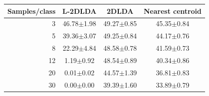 \begin{tabular}{rccc}
\toprule
Samples/class & L-2DLDA & 2DLDA & Nearest centroid \\
\midrule
3 & 46.78$\pm$1.98 & 49.27$\pm$0.85 & 45.35$\pm$0.84 \\
5 & 39.36$\pm$3.07 & 49.25$\pm$0.84 & 44.17$\pm$0.76 \\
8 & 22.29$\pm$4.84 & 48.58$\pm$0.78 & 41.59$\pm$0.73 \\
12 & 1.19$\pm$0.92 & 48.54$\pm$0.89 & 40.34$\pm$0.86 \\
20 & 0.01$\pm$0.02 & 44.57$\pm$1.39 & 36.81$\pm$0.83 \\
30 & 0.00$\pm$0.00 & 39.39$\pm$1.60 & 33.89$\pm$0.79 \\
\bottomrule
\end{tabular}
